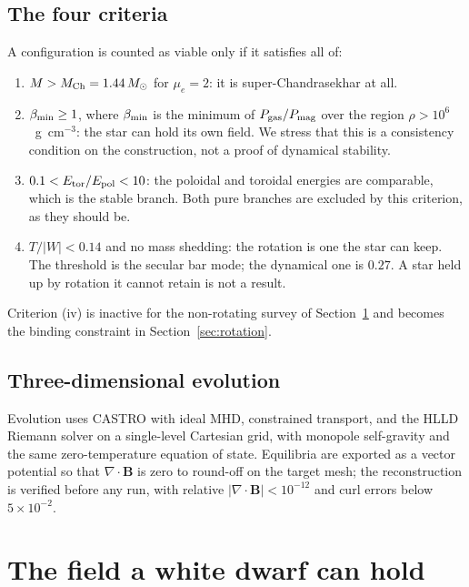 \documentclass[twocolumn,linenumbers]{aastex701}
\newcommand{\Msun}{M_\odot}
\newcommand{\Etor}{E_{\rm tor}}
\newcommand{\Epol}{E_{\rm pol}}
\newcommand{\Mch}{M_{\rm Ch}}
\newcommand{\bmin}{\beta_{\rm min}}
\begin{document}
\subsection{The four criteria} \label{sec:criteria}

A configuration is counted as viable only if it satisfies all of:

\begin{enumerate}
\item $M > \Mch = 1.44\,\Msun$ for $\mu_e = 2$: it is super-Chandrasekhar at
      all.
\item $\bmin \ge 1$, where $\bmin$ is the minimum of
      $P_{\rm gas}/P_{\rm mag}$ over the region $\rho > 10^{6}$~g~cm$^{-3}$:
      the star can hold its own field. We stress that this is a consistency
      condition on the construction, not a proof of dynamical stability.
\item $0.1 < \Etor/\Epol < 10$: the poloidal and toroidal energies are
      comparable, which is the \citet{braithwaite2006} stable branch. Both
      pure branches are excluded by this criterion, as they should be.
\item $T/|W| < 0.14$ and no mass shedding: the rotation is one the star can
      keep. The threshold is the secular bar mode; the dynamical one is
      $0.27$. A star held up by rotation it cannot retain is not a result.
\end{enumerate}

Criterion (iv) is inactive for the non-rotating survey of
Section~\ref{sec:ceiling} and becomes the binding constraint in
Section~\ref{sec:rotation}.

\subsection{Three-dimensional evolution}

Evolution uses CASTRO \citep{almgren2010} with ideal MHD, constrained
transport, and the HLLD Riemann solver on a single-level Cartesian grid, with
monopole self-gravity and the same zero-temperature equation of state.
Equilibria are exported as a vector potential so that $\nabla\cdot\mathbf{B}$
is zero to round-off on the target mesh; the reconstruction is verified before
any run, with relative $|\nabla\cdot\mathbf{B}| < 10^{-12}$ and curl errors
below $5\times10^{-2}$.

\section{The field a white dwarf can hold} \label{sec:ceiling}
\end{document}
